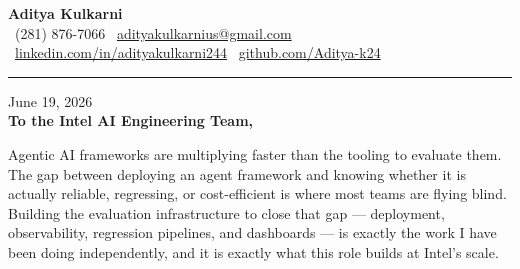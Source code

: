 \documentclass[11pt,letterpaper]{article}
\begin{document}
\begin{center}
    {\Huge \textbf{\color{IntelBlue} Aditya Kulkarni}}\\[8pt]
    {\color{DarkGrey} \small
    \faPhone \ (281) 876-7066 \quad \textbar \quad
    \faEnvelope \ \href{mailto:adityakulkarnius@gmail.com}{adityakulkarnius@gmail.com} \\[4pt]
    \faLinkedin \ \href{https://linkedin.com/in/adityakulkarni244}{linkedin.com/in/adityakulkarni244} \quad \textbar \quad
    \faGithub \ \href{https://github.com/Aditya-k24}{github.com/Aditya-k24}
    }
\end{center}

\vspace{-4pt}
{\color{IntelBlue}\rule{\linewidth}{1.5pt}}
\vspace{10pt}

June 19, 2026\\[10pt]
\textbf{To the Intel AI Engineering Team,}

\vspace{6pt}

Agentic AI frameworks are multiplying faster than the tooling to evaluate them. The gap between deploying an agent framework and knowing whether it is actually reliable, regressing, or cost-efficient is where most teams are flying blind. Building the evaluation infrastructure to close that gap --- deployment, observability, regression pipelines, and dashboards --- is exactly the work I have been doing independently, and it is exactly what this role builds at Intel's scale.

\vspace{4pt}
\end{document}
